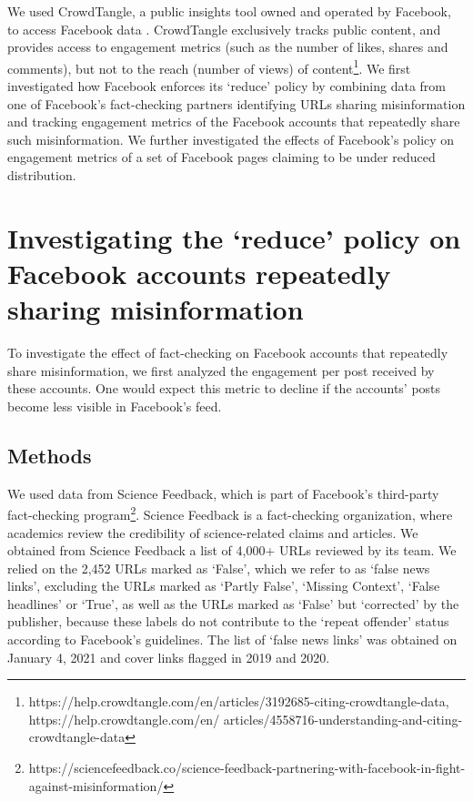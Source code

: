 \documentclass[11pt,a4paper]{article}
\begin{document}
We used CrowdTangle, a public insights tool owned and operated by Facebook, to access Facebook data \citep{team2020crowdtangle}. 
CrowdTangle exclusively tracks public content, and provides access to engagement metrics (such as the number of likes, shares and comments), but not to the reach (number of views) of content\footnote{https://help.crowdtangle.com/en/articles/3192685-citing-crowdtangle-data, https://help.crowdtangle.com/en/
articles/4558716-understanding-and-citing-crowdtangle-data}. 
We first investigated how Facebook enforces its ‘reduce’ policy by combining data from one of Facebook's fact-checking partners identifying URLs sharing misinformation and tracking engagement metrics of the Facebook accounts that repeatedly share such misinformation. 
We further investigated the effects of Facebook’s policy on engagement metrics of a set of Facebook pages claiming to be under reduced distribution.

\section{Investigating the `reduce’ policy on Facebook accounts repeatedly sharing misinformation}

To investigate the effect of fact-checking on Facebook accounts that repeatedly share misinformation, we first analyzed the engagement per post received by these accounts. One would expect this metric to decline if the accounts’ posts become less visible in Facebook’s feed.

\subsection{Methods}

We used data from Science Feedback, which is part of Facebook’s third-party fact-checking program\footnote{https://sciencefeedback.co/science-feedback-partnering-with-facebook-in-fight-against-misinformation/}. Science Feedback is a fact-checking organization, where academics review the credibility of science-related claims and articles. 
We obtained from Science Feedback a list of 4,000+ URLs reviewed by its team. 
We relied on the 2,452 URLs marked as `False', which we refer to as `false news links', excluding the URLs marked as `Partly False', `Missing Context', `False headlines' or `True', as well as the URLs marked as `False' but `corrected' by the publisher, because these labels do not contribute to the `repeat offender' status according to Facebook's guidelines. 
The list of `false news links' was obtained on January 4, 2021 and cover links flagged in 2019 and 2020.
\end{document}
